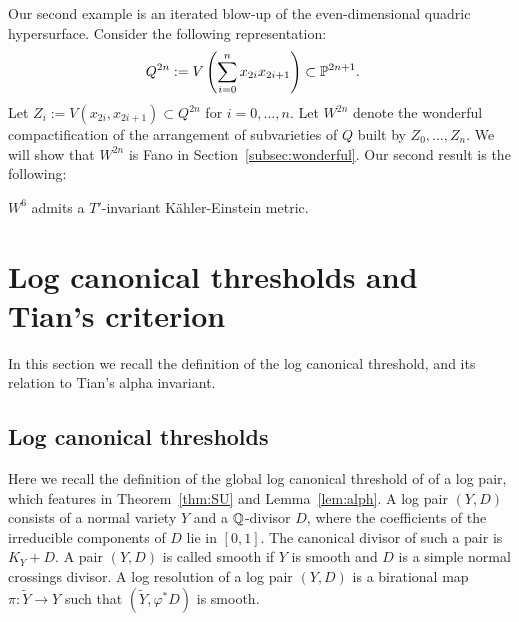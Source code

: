Our second example is an iterated blow-up of the even-dimensional quadric hypersurface. Consider the following representation:
\begin{align*}
Q^{2n} &:= V \left( \sum_{i=0}^{n} x_{2i}x_{2i+1} \right) \subset \mathbb{P}^{2n+1}.
\end{align*}
Let \(Z_i := V(x_{2i},x_{2i+1}) \subset Q^{2n}\) for \(i=0,\dots,n\). Let \(W^{2n}\) denote the wonderful compactification of the arrangement of subvarieties of \(Q\) built by \(Z_0,\dots,Z_n\). We will show that \(W^{2n}\) is Fano in Section~\ref{subsec:wonderful}. Our second result is the following:
\begin{theorem}\label{thm:KE2}
\(W^6\) admits a \(T'\)-invariant K\"ahler-Einstein metric.
\end{theorem}
\section{Log canonical thresholds and Tian's criterion}
In this section we recall the definition of the log canonical threshold, and its relation to Tian's alpha invariant.
\subsection{Log canonical thresholds}
Here we recall the definition of the global log canonical threshold of of a log pair, which features in Theorem~\ref{thm:SU} and Lemma~\ref{lem:alph}. A log pair \((Y,D)\) consists of a normal variety \(Y\) and a \(\mathbb{Q}\)-divisor \(D\), where the coefficients of the irreducible components of \(D\) lie in \([0,1]\). The canonical divisor of such a pair is \(K_Y+D\). A pair \((Y,D)\) is called smooth if \(Y\) is smooth and \(D\) is a simple normal crossings divisor. A log resolution of a log pair \((Y,D)\) is a birational map \(\pi: \tilde{Y} \to Y\) such that \((\tilde{Y},\varphi^*D)\) is smooth.

